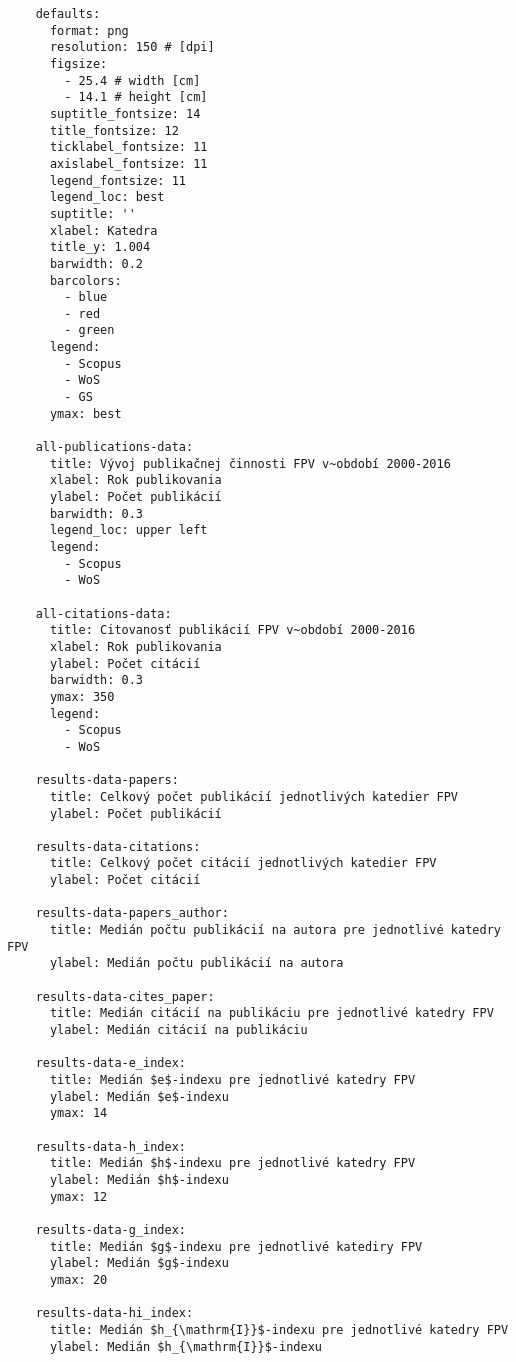 \begin{source}
  \begin{verbatim}
    defaults:
      format: png
      resolution: 150 # [dpi]
      figsize:
        - 25.4 # width [cm]
        - 14.1 # height [cm]
      suptitle_fontsize: 14
      title_fontsize: 12
      ticklabel_fontsize: 11
      axislabel_fontsize: 11
      legend_fontsize: 11
      legend_loc: best
      suptitle: ''
      xlabel: Katedra
      title_y: 1.004
      barwidth: 0.2
      barcolors:
        - blue
        - red
        - green
      legend:
        - Scopus
        - WoS
        - GS
      ymax: best

    all-publications-data:
      title: Vývoj publikačnej činnosti FPV v~období 2000-2016
      xlabel: Rok publikovania
      ylabel: Počet publikácií
      barwidth: 0.3
      legend_loc: upper left
      legend:
        - Scopus
        - WoS

    all-citations-data:
      title: Citovanosť publikácií FPV v~období 2000-2016
      xlabel: Rok publikovania
      ylabel: Počet citácií
      barwidth: 0.3
      ymax: 350
      legend:
        - Scopus
        - WoS

    results-data-papers:
      title: Celkový počet publikácií jednotlivých katedier FPV
      ylabel: Počet publikácií

    results-data-citations:
      title: Celkový počet citácií jednotlivých katedier FPV
      ylabel: Počet citácií

    results-data-papers_author:
      title: Medián počtu publikácií na autora pre jednotlivé katedry FPV
      ylabel: Medián počtu publikácií na autora

    results-data-cites_paper:
      title: Medián citácií na publikáciu pre jednotlivé katedry FPV
      ylabel: Medián citácií na publikáciu

    results-data-e_index:
      title: Medián $e$-indexu pre jednotlivé katedry FPV
      ylabel: Medián $e$-indexu
      ymax: 14

    results-data-h_index:
      title: Medián $h$-indexu pre jednotlivé katedry FPV
      ylabel: Medián $h$-indexu
      ymax: 12

    results-data-g_index:
      title: Medián $g$-indexu pre jednotlivé katediry FPV
      ylabel: Medián $g$-indexu
      ymax: 20

    results-data-hi_index:
      title: Medián $h_{\mathrm{I}}$-indexu pre jednotlivé katedry FPV
      ylabel: Medián $h_{\mathrm{I}}$-indexu


\end{verbatim}
\end{source}
